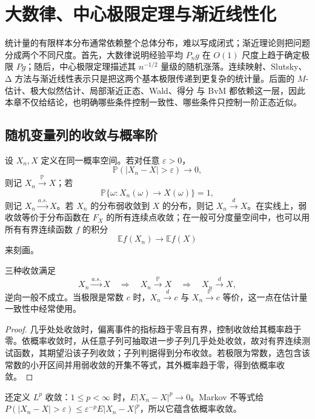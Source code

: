 \chapter{大数律、中心极限定理与渐近线性化}\label{chap:math-stat-asymptotics}

统计量的有限样本分布通常依赖整个总体分布，难以写成闭式；渐近理论则把问题分成两个不同尺度。首先，大数律说明经验平均 $P_ng$ 在 $O(1)$ 尺度上趋于确定极限 $Pg$；随后，中心极限定理描述其 $n^{-1/2}$ 量级的随机涨落。连续映射、Slutsky、Δ 方法与渐近线性表示只是把这两个基本极限传递到更复杂的统计量。后面的 $M$-估计、极大似然估计、局部渐近正态、Wald、得分 与 BvM 都依赖这一层，因此本章不仅给结论，也明确哪些条件控制一致性、哪些条件只控制一阶正态近似。

\section{随机变量列的收敛与概率阶}

\begin{definition}[随机变量列的收敛]
设 $X_n,X$ 定义在同一概率空间。若对任意 $\varepsilon>0$，
\[
 \mathbb P(|X_n-X|>\varepsilon)\to0,
\]
则记 $X_n\xrightarrow{\mathbb P} X$；若
\[
 \mathbb P\{\omega:X_n(\omega)\to X(\omega)\}=1,
\]
则记 $X_n\xrightarrow{a.s.} X$。若 $X_n$ 的分布弱收敛到 $X$ 的分布，则记 $X_n\xrightarrow{d} X$。在实线上，弱收敛等价于分布函数在 $F_X$ 的所有连续点收敛；在一般可分度量空间中，也可以用所有有界连续函数 $f$ 的积分
\[
 \mathbb E f(X_n)\to\mathbb E f(X)
\]
来刻画。

\end{definition}
\begin{proposition}[收敛方式之间的关系]
三种收敛满足
\[
 X_n\xrightarrow{a.s.} X
 \quad\Longrightarrow\quad
 X_n\xrightarrow{\mathbb P} X
 \quad\Longrightarrow\quad
 X_n\xrightarrow{d} X,
\]
逆向一般不成立。当极限是常数 $c$ 时，$X_n\xrightarrow{d} c$ 与 $X_n\xrightarrow{\mathbb P} c$ 等价，这一点在估计量一致性中经常使用。
\end{proposition}
\begin{proof}
几乎处处收敛时，偏离事件的指标趋于零且有界，控制收敛给其概率趋于零。依概率收敛时，从任意子列可抽取进一步子列几乎处处收敛，故对有界连续测试函数，其期望沿该子列收敛；子列判据得到分布收敛。若极限为常数，选包含该常数的小开区间并用弱收敛的开集不等式，其外概率趋于零，得到依概率收敛。
\end{proof}

还定义 $L^p$ 收敛：$1\le p<\infty$ 时，$E|X_n-X|^p\to0$。Markov 不等式给 $P(|X_n-X|>\varepsilon)\le\varepsilon^{-p}E|X_n-X|^p$，所以它蕴含依概率收敛。

